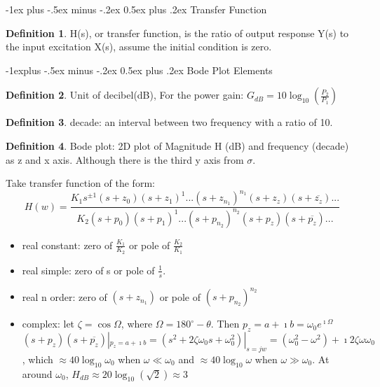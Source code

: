 \documentclass[10pt,landscape]{article}
\makeatletter
\renewcommand{\section}{\@startsection{section}{1}{0mm}%
                                {-1ex plus -.5ex minus -.2ex}%
                                {0.5ex plus .2ex}%
                                {\normalfont\large\bfseries}}
\renewcommand{\subsection}{\@startsection{subsection}{2}{0mm}%
                                {-1explus -.5ex minus -.2ex}%
                                {0.5ex plus .2ex}%
                                {\normalfont\normalsize\bfseries}}
\theoremstyle{definition}
\newtheorem*{defin}{Definition}
\theoremstyle{remark}
\makeatother
\begin{document}
\begin{multicols}{3}
\section{Transfer Function}
\begin{defin}
H(s), or transfer function, is the ratio of output response Y(s) to the input excitation X(s), assume the initial condition is zero. 
\end{defin}


\subsection{Bode Plot Elements}
\begin{defin}
Unit of decibel(dB), For the power gain: 
$G_{dB} = 10 \log_10(\frac{P_2}{P_1})$
\end{defin}
\begin{defin}
decade: an interval between two frequency with a ratio of 10. 
\end{defin}

\begin{defin}
Bode plot: 2D plot of Magnitude H (dB) and frequency (decade) as z and x axis. Although there is the third y axis from $\sigma$. 
\end{defin}

Take transfer function of the form: $$H(w) = \frac{K_1s^{\pm 1}(s+z_0)(s+z_1)^1...(s+z_{n_1})^{n_1}(s+z_z)(s + \overline{z_z})...}{K_2(s+p_0)(s+p_1)^1...(s+p_{n_2})^{n_2}(s + p_z)(s + \overline{p_z})...}$$

\begin{itemize}[noitemsep,nolistsep]
    \item real constant: zero of $\frac{K_1}{K_2}$ or pole of $\frac{K_2}{K_1}$
    \item real simple: zero of s or pole of $\frac{1}{s}$. 
    \item real n order: zero of $(s+z_{n_1})$ or pole of $(s+p_{n_2})^{n_2}$
    \item complex: let $\zeta = \cos\Omega$, where $\Omega= 180^{\circ} - \theta$. Then $p_z = a + \imath b = \omega_0 e^{\imath\Omega}$ \\
    $(s + p_z)(s + \overline{p_z})|_{p_z = a + \imath b} = (s^2 + 2\zeta \omega_0 s + \omega_0^2)|_{s=jw} = (\omega_0^2 - \omega^2) + \imath 2 \zeta \omega\omega_0$, which $\approx 40\log_10\omega_0$ when $\omega \ll \omega_0$ and  $\approx 40\log_10\omega$ when $\omega \gg \omega_0$. At around $\omega_0$, $H_{dB} \approx 20\log_{10}(\sqrt{2}) \approx 3$
\end{itemize}


\end{multicols}
\end{document}
